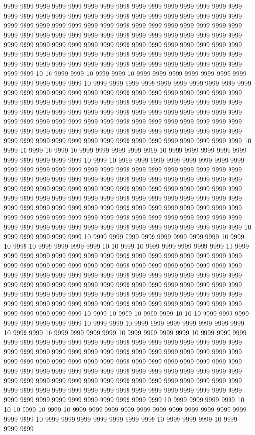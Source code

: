 9999 9999 9999 9999 9999 9999 9999 9999 9999 9999 9999 9999 9999 9999 9999 9999 9999 9999 9999 9999 9999 9999 9999 9999 9999 9999 9999 9999 9999 9999 9999 9999 9999 9999 9999 9999 9999 9999 9999 9999 9999 9999 9999 9999 9999 9999 9999 9999 9999 9999 9999 9999 9999 9999 9999 9999 9999 9999 9999 9999 9999 9999 9999 9999 9999 9999 9999 9999 9999 9999 9999 9999 9999 9999 9999 9999 9999 9999 9999 9999 9999 9999 9999 9999 9999 9999 9999 9999 9999 9999 9999 9999 9999 9999 9999 9999 9999 9999 9999 9999 9999 9999 9999 9999 9999 9999 9999 10 10 9999 9999 10 9999 9999 10 9999 9999 9999 9999 9999 9999 9999 9999 9999 9999 9999 9999 10 9999 9999 9999 9999 9999 9999 9999 9999 9999 9999 9999 9999 9999 9999 9999 9999 9999 9999 9999 9999 9999 9999 9999 9999 9999 9999 9999 9999 9999 9999 9999 9999 9999 9999 9999 9999 9999 9999 9999 9999 9999 9999 9999 9999 9999 9999 9999 9999 9999 9999 9999 9999 9999 9999 9999 9999 9999 9999 9999 9999 9999 9999 9999 9999 9999 9999 9999 9999 9999 9999 9999 9999 9999 9999 9999 9999 9999 9999 9999 9999 9999 9999 9999 9999 9999 9999 9999 9999 9999 9999 9999 9999 9999 9999 9999 9999 9999 9999 9999 9999 10 9999 10 9999 10 9999 10 9999 9999 9999 9999 9999 10 9999 9999 9999 9999 9999 9999 9999 9999 9999 9999 10 9999 10 9999 9999 9999 9999 9999 9999 9999 9999 9999 9999 9999 9999 9999 9999 9999 9999 9999 9999 9999 9999 9999 9999 9999 9999 9999 9999 9999 9999 9999 9999 9999 9999 9999 9999 9999 9999 9999 9999 9999 9999 9999 9999 9999 9999 9999 9999 9999 9999 9999 9999 9999 9999 9999 9999 9999 9999 9999 9999 9999 9999 9999 9999 9999 9999 9999 9999 9999 9999 9999 9999 9999 9999 9999 9999 9999 9999 9999 9999 9999 9999 9999 9999 9999 9999 9999 9999 9999 9999 9999 9999 9999 9999 9999 9999 9999 9999 9999 9999 9999 9999 9999 9999 9999 9999 9999 9999 9999 9999 9999 9999 9999 9999 9999 10 9999 9999 9999 9999 9999 10 9999 9999 9999 9999 9999 9999 9999 9999 10 9999 10 9999 10 9999 9999 9999 9999 10 10 9999 10 9999 9999 9999 9999 9999 10 9999 9999 9999 9999 9999 9999 9999 9999 9999 9999 9999 9999 9999 9999 9999 9999 9999 9999 9999 9999 9999 9999 9999 9999 9999 9999 9999 9999 9999 9999 9999 9999 9999 9999 9999 9999 9999 9999 9999 9999 9999 9999 9999 9999 9999 9999 9999 9999 9999 9999 9999 9999 9999 9999 9999 9999 9999 9999 9999 9999 9999 9999 9999 9999 9999 9999 9999 9999 9999 9999 9999 9999 9999 9999 9999 9999 9999 9999 9999 9999 9999 9999 9999 9999 9999 9999 9999 9999 9999 9999 9999 9999 9999 9999 9999 9999 10 9999 10 9999 10 9999 9999 10 10 10 9999 9999 9999 9999 9999 9999 9999 9999 10 9999 9999 10 9999 9999 9999 9999 9999 9999 9999 10 9999 9999 10 9999 9999 9999 9999 10 9999 9999 9999 9999 10 9999 9999 9999 9999 9999 9999 9999 9999 9999 9999 9999 9999 9999 9999 9999 9999 9999 9999 9999 9999 9999 9999 9999 9999 9999 9999 9999 9999 9999 9999 9999 9999 9999 9999 9999 9999 9999 9999 9999 9999 9999 9999 9999 9999 9999 9999 9999 9999 9999 9999 9999 9999 9999 9999 9999 9999 9999 9999 9999 9999 9999 9999 9999 9999 9999 9999 9999 9999 9999 9999 9999 9999 9999 9999 9999 9999 9999 9999 9999 9999 9999 9999 9999 9999 9999 9999 9999 9999 9999 9999 9999 9999 9999 9999 9999 9999 9999 9999 9999 9999 9999 9999 9999 10 9999 9999 9999 9999 10 10 10 9999 10 9999 10 9999 9999 9999 9999 9999 9999 9999 9999 9999 9999 9999 9999 9999 10 9999 9999 9999 9999 9999 9999 9999 10 9999 9999 9999 10 9999 9999 9999 